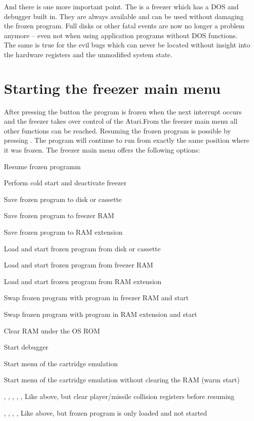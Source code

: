 And there is one more important point. The \frz is a freezer which has a DOS and
debugger built in. They are always available and can be used without damaging
the frozen program. Full disks or other fatal events are now no longer a problem
anymore -- even not when using application programs without DOS functions. The
same is true for the evil bugs which can never be located without insight into
the hardware registers and the unmodified system state.

\section{Starting the freezer main menu}

After pressing the  button the program is frozen when the next
interrupt occurs and the freezer takes over control of the Atari.From the
freezer main menu all other functions can be reached. Resuming the frozen
program is possible by pressing . The program will continue to run
from exactly the same position where it was frozen. The freezer main menu offers
the following options:

\begin{flist}
\item[\fkey{SPACE}]
  Resume frozen programm
\item[\fkey{RESET}]
  Perform cold start and deactivate freezer
\item[\fkey{S}]
  Save frozen program to disk or cassette
\item[\fkey{F}]
  Save frozen program to freezer RAM
\item[\fkey{R}]
  Save frozen program to RAM extension 
\item[\fkey{E}]
  Load and start frozen program from disk or cassette
\item[\fkey{C}]
  Load and start frozen program from freezer RAM
\item[\fkey{X}]
  Load and start frozen program from RAM extension
\item[\fkey{W}]
  Swap frozen program with program in freezer RAM and start
\item[\fkey{A}]
 Swap frozen program with program in RAM extension and start
\item[\fkey{Z}]
  Clear RAM under the OS ROM
\item[\fkey{D}]
  Start debugger
\item[\fkey{K}]
  Start menu of the cartridge emulation
\item[\fkeys{K}]
  Start menu of the cartridge emulation without clearing the RAM (warm start)
\item[\fkeys{SPACE}, \fkey{E}, \fkey{C}, \fkey{X}, \fkey{W}, \fkey{A}]
  Like above, but clear player/missile collision registers before resuming
\item[\fkeyc{E}, \fkey{C}, \fkey{X}, \fkey{W}, \fkey{A}]
  Like above, but frozen program is only loaded and not started
\end{flist}

